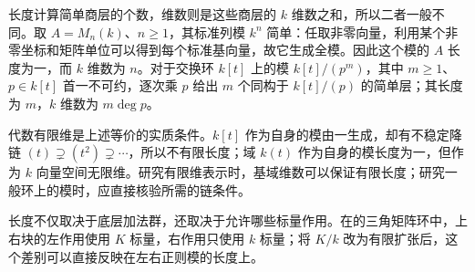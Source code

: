 长度计算简单商层的个数，维数则是这些商层的 \(k\) 维数之和，所以二者一般不同。取 \(A=M_n(k)\)、\(n\ge1\)，其标准列模 \(k^n\) 简单：任取非零向量，利用某个非零坐标和矩阵单位可以得到每个标准基向量，故它生成全模。因此这个模的 \(A\) 长度为一，而 \(k\) 维数为 \(n\)。对于交换环 \(k[t]\) 上的模 \(k[t]/(p^m)\)，其中 \(m\ge1\)、\(p\in k[t]\) 首一不可约，逐次乘 \(p\) 给出 \(m\) 个同构于 \(k[t]/(p)\) 的简单层；其长度为 \(m\)，\(k\) 维数为 \(m\deg p\)。

\ProseParagraphBreak
代数有限维是上述等价的实质条件。\(k[t]\) 作为自身的模由一生成，却有不稳定降链 \((t)\supsetneq(t^2)\supsetneq\cdots\)，所以不有限长度；域 \(k(t)\) 作为自身的模长度为一，但作为 \(k\) 向量空间无限维。研究有限维表示时，基域维数可以保证有限长度；研究一般环上的模时，应直接核验所需的链条件。

\ProseParagraphBreak
长度不仅取决于底层加法群，还取决于允许哪些标量作用。在的三角矩阵环中，上右块的左作用使用 \(K\) 标量，右作用只使用 \(k\) 标量；将 \(K/k\) 改为有限扩张后，这个差别可以直接反映在左右正则模的长度上。

